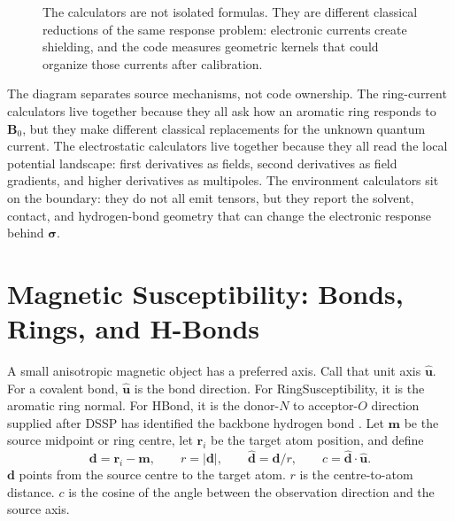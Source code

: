 \documentclass[11pt]{article}
\begin{document}
\begin{figure}[ht]
{}
\caption{The calculators are not isolated formulas. They are different
classical reductions of the same response problem: electronic currents create
shielding, and the code measures geometric kernels that could organize those
currents after calibration.}
\end{figure}

The diagram separates source mechanisms, not code ownership. The ring-current
calculators live together because they all ask how an aromatic ring responds to
\(\bm B_0\), but they make different classical replacements for the unknown
quantum current. The electrostatic calculators live together because they all
read the local potential landscape: first derivatives as fields, second
derivatives as field gradients, and higher derivatives as multipoles. The
environment calculators sit on the boundary: they do not all emit tensors, but
they report the solvent, contact, and hydrogen-bond geometry that can change the
electronic response behind \(\bm\sigma\).

\section{Magnetic Susceptibility: Bonds, Rings, and H-Bonds}

A small anisotropic magnetic object has a preferred axis. Call that unit axis
\(\hat{\bm u}\). For a covalent bond, \(\hat{\bm u}\) is the bond direction.
For RingSusceptibility, it is the aromatic ring normal. For HBond, it is the
donor-\(N\) to acceptor-\(O\) direction supplied after DSSP has identified the
backbone hydrogen bond \cite{kabsch1983}. Let \(\bm m\) be the source midpoint
or ring centre, let \(\bm r_i\) be the target atom position, and define
\[
  \bm d=\bm r_i-\bm m,\qquad
  r=|\bm d|,\qquad
  \hat{\bm d}=\bm d/r,\qquad
  c=\hat{\bm d}\cdot\hat{\bm u}.
\]
\(\bm d\) points from the source centre to the target atom. \(r\) is the
centre-to-atom distance. \(c\) is the cosine of the angle between the
observation direction and the source axis.
\end{document}
